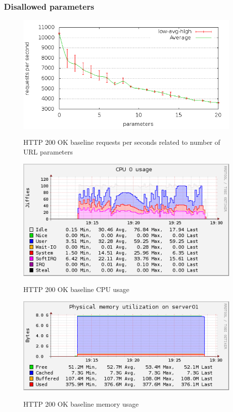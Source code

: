 \documentclass[Measurements]{subfiles}
\begin{document}
\subsubsection{Disallowed parameters}

\begin{figure}[H]
\caption{HTTP 200 OK baseline requests per seconds related to number of URL parameters}
\centering
\includegraphics[scale=0.55] {images/results/200_with_naxsi_incremented_disallowed_parameters/output.png}
\label{fig:Baseline performance measurement}
\end{figure}

\begin{figure}[H]
\centering
\caption{HTTP 200 OK baseline CPU usage}
\includegraphics[scale=0.7]{images/results/200_with_naxsi_incremented_disallowed_parameters/cpu.png}
\label{fig:Baseline Nginx CPU usage}
\end{figure}

\begin{figure}[H]
\centering
\caption{HTTP 200 OK baseline memory usage}
\includegraphics[scale=0.7]{images/results/200_with_naxsi_incremented_disallowed_parameters/memory.png}
\label{fig:Baseline Nginx memory usage}
\end{figure}
\end{document}

